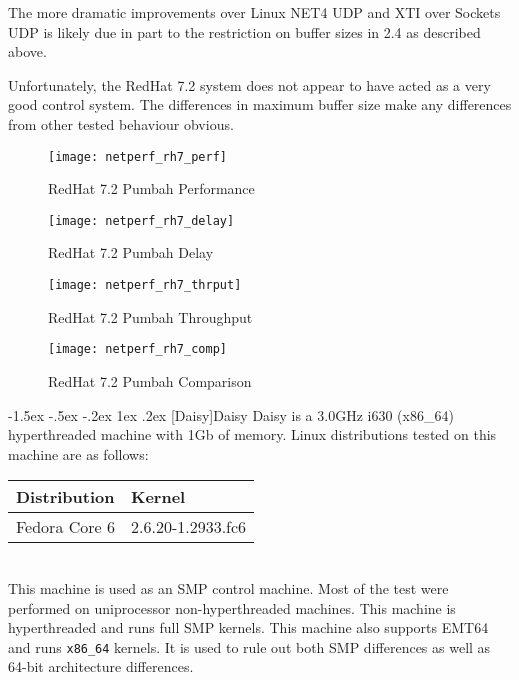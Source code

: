 \documentclass[letterpaper,final,notitlepage,twocolumn,10pt,twoside]{article}
\makeatletter
\let\normalsize\small
\let\small\footnotesize
\let\footnotesize\scriptsize
\let\scriptsize\tiny
\renewcommand\subsection{\@startsection{subsection}{2}{\z@}%
                                     {-1.5ex \@plus -.5ex \@minus -.2ex}%
                                     {1ex \@plus .2ex}%
                                     {\normalfont\normalsize\bfseries}}
\makeatother
\begin{document}
The more dramatic improvements over Linux NET4 UDP and XTI over Sockets UDP is
likely due in part to the restriction on buffer sizes in 2.4 as described
above.

Unfortunately, the RedHat 7.2 system does not appear to have acted as a very
good control system.  The differences in maximum buffer size make any
differences from other tested behaviour obvious.

\begin{figure}[p]
\center\texttt{[image: netperf\_rh7\_perf]}
\caption[RedHat 7.2 Pumbah Performance]{RedHat 7.2 Pumbah Performance}
\label{figure:rh7perf}
\end{figure}

\begin{figure}[p]
\center\texttt{[image: netperf\_rh7\_delay]}
\caption[RedHat 7.2 Pumbah Delay]{RedHat 7.2 Pumbah Delay}
\label{figure:rh7dly}
\end{figure}

\begin{figure}[p]
\center\texttt{[image: netperf\_rh7\_thrput]}
\caption[RedHat 7.2 Pumbah Throughput]{RedHat 7.2 Pumbah Throughput}
\label{figure:rh7thrput}
\end{figure}

\begin{figure}[p]
\center\texttt{[image: netperf\_rh7\_comp]}
\caption[RedHat 7.2 Pumbah Comparison]{RedHat 7.2 Pumbah Comparison}
\label{figure:rh7comp}
\end{figure}

\subsection[Daisy]{Daisy}
Daisy is a 3.0GHz i630 (x86\_64) hyperthreaded machine with 1Gb of memory.
Linux distributions tested on this machine are as follows:

\begin{tabular}{ll}\\
Distribution & Kernel\\
\hline
Fedora Core 6 & 2.6.20-1.2933.fc6\\
\end{tabular}\\[1.0ex]

This machine is used as an SMP control machine.  Most of the test were
performed on uniprocessor non-hyperthreaded machines.  This machine is
hyperthreaded and runs full SMP kernels.  This machine also supports EMT64 and
runs \texttt{x86\_64} kernels.  It is used to rule out both SMP differences as
well as 64-bit architecture differences.
\end{document}
